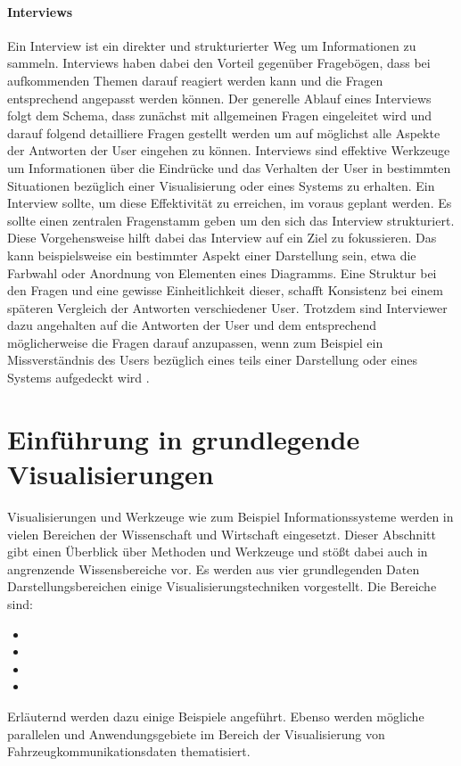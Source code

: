 \documentclass[draft=false
              ,paper=a4
              ,twoside=false
              ,fontsize=11pt
              ,headsepline
              ,BCOR10mm
              ,DIV11
              ]{scrbook}
\newcommand{\TODO}[1]{\colorbox{yellow}{\textcolor{red}{[TODO: #1]}}}
\begin{document}
\paragraph{Interviews} %
\label{par:interviews}
Ein Interview ist ein direkter und strukturierter Weg um Informationen zu sammeln. Interviews haben dabei den Vorteil gegenüber Fragebögen, dass bei aufkommenden Themen darauf reagiert werden kann und die Fragen entsprechend angepasst werden können. Der generelle Ablauf eines Interviews folgt dem Schema, dass zunächst mit allgemeinen Fragen eingeleitet wird und darauf folgend detailliere Fragen gestellt werden um auf möglichst alle Aspekte der Antworten der User eingehen zu können.
Interviews sind effektive Werkzeuge um Informationen über die Eindrücke und das Verhalten der User in bestimmten Situationen bezüglich einer Visualisierung oder eines Systems zu erhalten. Ein Interview sollte, um diese Effektivität zu erreichen, im voraus geplant werden. Es sollte einen zentralen Fragenstamm geben um den sich das Interview strukturiert. Diese Vorgehensweise hilft dabei das Interview auf ein Ziel zu fokussieren. Das kann beispielsweise ein bestimmter Aspekt einer Darstellung sein, etwa die Farbwahl oder Anordnung von Elementen eines Diagramms. Eine Struktur bei den Fragen und eine gewisse Einheitlichkeit dieser, schafft Konsistenz bei einem späteren Vergleich der Antworten verschiedener User. Trotzdem sind Interviewer dazu angehalten auf die Antworten der User und dem entsprechend möglicherweise die Fragen darauf anzupassen, wenn zum Beispiel ein Missverständnis des Users bezüglich eines teils einer Darstellung oder eines Systems aufgedeckt wird \cite{ader_advising_2008}.

\section{Einführung in grundlegende Visualisierungen} %
\label{sec:einfuhrung_in_grundlegende_visualisierungen}
Visualisierungen und Werkzeuge wie zum Beispiel Informationssysteme werden in vielen Bereichen der Wissenschaft und Wirtschaft eingesetzt. Dieser Abschnitt gibt einen Überblick über Methoden und Werkzeuge und stößt dabei auch in angrenzende Wissensbereiche vor. Es werden aus vier grundlegenden Daten Darstellungsbereichen einige Visualisierungstechniken vorgestellt. Die Bereiche sind:
\begin{itemize}
   \item {}
   \item {}
   \item {}
   \item {}
 \end{itemize} 
Erläuternd werden dazu einige Beispiele angeführt. Ebenso werden mögliche parallelen und Anwendungsgebiete im Bereich der Visualisierung von Fahrzeugkommunikationsdaten thematisiert. 
\end{document}
